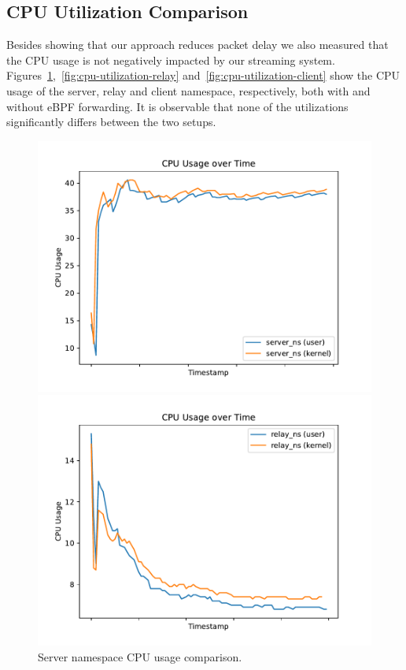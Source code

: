 \subsection{CPU Utilization Comparison}
Besides showing that our approach reduces packet delay we also measured that the CPU usage is 
not negatively impacted by our streaming system.
Figures~\ref{fig:cpu-utilization-server},~\ref{fig:cpu-utilization-relay} and~\ref{fig:cpu-utilization-client}
show the CPU usage of the server, relay and client namespace, respectively, both with and without eBPF forwarding.
It is observable that none of the utilizations significantly differs between the two setups. 

\begin{figure}[H]
    \begin{minipage}{0.48\textwidth}
        \centering
        \includegraphics[width=1\linewidth]{figures/04_testing_and_results/cpu_usage_server_ns.pdf}
        \caption[Server CPU usage comparison]{Server namespace CPU usage comparison.}\label{fig:cpu-utilization-server}
    \end{minipage}\hfill
    \begin{minipage}{0.48\textwidth}
        \centering
        \includegraphics[width=1\linewidth]{figures/04_testing_and_results/cpu_usage_relay_ns.pdf}

\end{minipage}
\end{figure}
